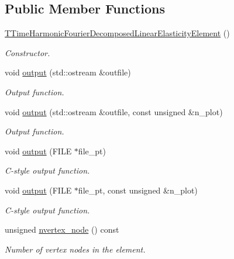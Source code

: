\subsection*{Public Member Functions}
\begin{DoxyCompactItemize}
\item 
\hyperlink{classoomph_1_1TTimeHarmonicFourierDecomposedLinearElasticityElement_ad94e8a6c8133172e65185a96cc53f68e}{T\+Time\+Harmonic\+Fourier\+Decomposed\+Linear\+Elasticity\+Element} ()
\begin{DoxyCompactList}\small\item\em Constructor. \end{DoxyCompactList}\item 
void \hyperlink{classoomph_1_1TTimeHarmonicFourierDecomposedLinearElasticityElement_ae14527add57636a4412ea584dd66cdbe}{output} (std\+::ostream \&outfile)
\begin{DoxyCompactList}\small\item\em Output function. \end{DoxyCompactList}\item 
void \hyperlink{classoomph_1_1TTimeHarmonicFourierDecomposedLinearElasticityElement_a8f1141e19dcdd594824d1adc971b2832}{output} (std\+::ostream \&outfile, const unsigned \&n\+\_\+plot)
\begin{DoxyCompactList}\small\item\em Output function. \end{DoxyCompactList}\item 
void \hyperlink{classoomph_1_1TTimeHarmonicFourierDecomposedLinearElasticityElement_a81a75203b1c0d2f110259547e51c8cac}{output} (F\+I\+LE $\ast$file\+\_\+pt)
\begin{DoxyCompactList}\small\item\em C-\/style output function. \end{DoxyCompactList}\item 
void \hyperlink{classoomph_1_1TTimeHarmonicFourierDecomposedLinearElasticityElement_a05e2f49a9bd2941f4bbabd5f0279d86a}{output} (F\+I\+LE $\ast$file\+\_\+pt, const unsigned \&n\+\_\+plot)
\begin{DoxyCompactList}\small\item\em C-\/style output function. \end{DoxyCompactList}\item 
unsigned \hyperlink{classoomph_1_1TTimeHarmonicFourierDecomposedLinearElasticityElement_a57870ab2c9c506070441d8a428820d27}{nvertex\+\_\+node} () const
\begin{DoxyCompactList}\small\item\em Number of vertex nodes in the element. \end{DoxyCompactList}\item 

\end{DoxyCompactItemize}
